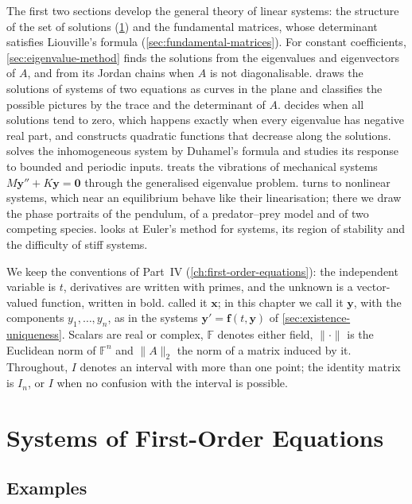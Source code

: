 The first two sections develop the general theory of linear systems: the structure of the set of solutions (\cref{sec:ode-systems}) and the fundamental matrices, whose determinant satisfies Liouville's formula (\cref{sec:fundamental-matrices}). For constant coefficients, \cref{sec:eigenvalue-method} finds the solutions from the eigenvalues and eigenvectors of $A$, and from its Jordan chains when $A$ is not diagonalisable.  draws the solutions of systems of two equations as curves in the plane and classifies the possible pictures by the trace and the determinant of $A$.  decides when all solutions tend to zero, which happens exactly when every eigenvalue has negative real part, and constructs quadratic functions that decrease along the solutions.  solves the inhomogeneous system by Duhamel's formula and studies its response to bounded and periodic inputs.  treats the vibrations of mechanical systems $M\mathbf y''+K\mathbf y=\mathbf 0$ through the generalised eigenvalue problem.  turns to nonlinear systems, which near an equilibrium behave like their linearisation; there we draw the phase portraits of the pendulum, of a predator--prey model and of two competing species.  looks at Euler's method for systems, its region of stability and the difficulty of stiff systems.

We keep the conventions of Part~IV (\cref{ch:first-order-equations}): the independent variable is $t$, derivatives are written with primes, and the unknown is a vector-valued function, written in bold.  called it $\mathbf x$; in this chapter we call it $\mathbf y$, with the components $y_1,\ldots,y_n$, as in the systems $\mathbf y'=\mathbf f(t,\mathbf y)$ of \cref{sec:existence-uniqueness}. Scalars are real or complex, $\mathbb F$ denotes either field, $\|\cdot\|$ is the Euclidean norm of $\mathbb F^n$ and $\|A\|_2$ the norm of a matrix induced by it. Throughout, $I$ denotes an interval with more than one point; the identity matrix is $I_n$, or $I$ when no confusion with the interval is possible.

\section{Systems of First-Order Equations}
\label{sec:ode-systems}

\subsection{Examples}


